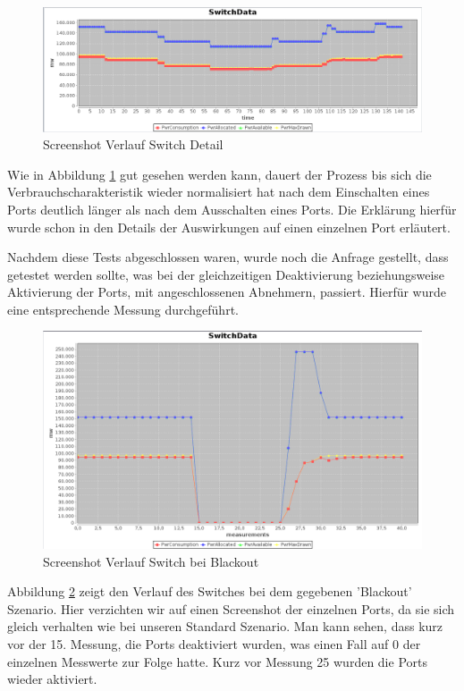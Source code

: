 \begin{figure}[h]
    \centering
    \leavevmode
    \includegraphics[width=1.0\linewidth]{figures/switchConsequences}
    \caption{Screenshot Verlauf Switch Detail}
    \label{fig:switchDetails}
\end{figure}

Wie in Abbildung \ref{fig:switchDetails} gut gesehen werden kann, dauert der Prozess bis sich die Verbrauchscharakteristik wieder normalisiert hat nach dem Einschalten eines Ports deutlich länger als nach dem Ausschalten eines Ports. Die Erklärung hierfür wurde schon in den Details der Auswirkungen auf einen einzelnen Port erläutert.

Nachdem diese Tests abgeschlossen waren, wurde noch die Anfrage gestellt, dass getestet werden sollte, was bei der gleichzeitigen Deaktivierung beziehungsweise Aktivierung der Ports, mit angeschlossenen Abnehmern, passiert. Hierfür wurde eine entsprechende Messung durchgeführt.

\begin{figure}[h]
    \centering
    \leavevmode
    \includegraphics[width=1.0\linewidth]{figures/blackout}
    \caption{Screenshot Verlauf Switch bei Blackout}
    \label{fig:blackout}
\end{figure}

Abbildung \ref{fig:blackout} zeigt den Verlauf des Switches bei dem gegebenen 'Blackout' Szenario. Hier verzichten wir auf einen Screenshot der einzelnen Ports, da sie sich gleich verhalten wie bei unseren Standard Szenario. Man kann sehen, dass kurz vor der 15. Messung, die Ports deaktiviert wurden, was einen Fall auf 0 der einzelnen Messwerte zur Folge hatte. Kurz vor Messung 25 wurden die Ports wieder aktiviert.

